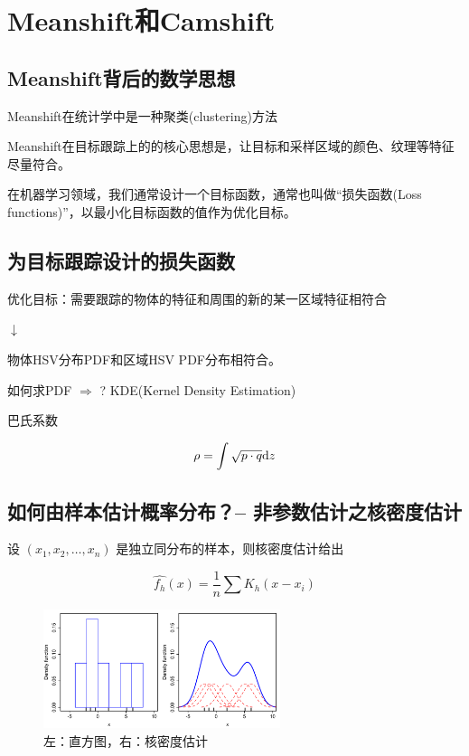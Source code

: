 \section{Meanshift和Camshift}

\subsection{Meanshift背后的数学思想}
Meanshift在统计学中是一种聚类(clustering)方法

Meanshift在目标跟踪上的的核心思想是，让目标和采样区域的颜色、纹理等特征尽量符合。

在机器学习领域，我们通常设计一个目标函数，通常也叫做``损失函数(Loss functions)''，以最小化目标函数的值作为优化目标。

\subsection{为目标跟踪设计的损失函数}

优化目标：需要跟踪的物体的特征和周围的新的某一区域特征相符合
\begin{center}
    $\downarrow$
\end{center}

物体HSV分布PDF和区域HSV PDF分布相符合。

\vspace{2em}

如何求PDF $\Rightarrow$ ?  KDE(Kernel Density Estimation)

巴氏系数

\begin{equation}
    \rho = \int \sqrt{p \cdot q} \mathrm{d} z
\end{equation}

\subsection{如何由样本估计概率分布？-- 非参数估计之核密度估计}

设 $(x_1, x_2, \dots, x_n)$ 是独立同分布的样本，则核密度估计给出

\begin{equation}
    \hat{f_h} (x) = \frac{1}{n} \sum K_h(x - x_i)
\end{equation}
\begin{figure}
    \centering
    \includegraphics[width=0.618\textwidth]{images/Comparison_of_1D_histogram_and_KDE.png}
    \caption{左：直方图，右：核密度估计}
\end{figure}

